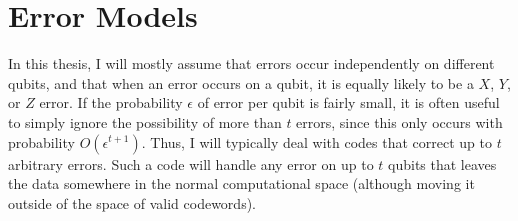 \section{Error Models}

In this thesis, I will mostly assume that errors occur independently on
different qubits, and that when an error occurs on a qubit, it is equally
likely to be a $X$, $Y$, or $Z$ error.  If the probability $\epsilon$ of
error per qubit is fairly small, it is often useful to simply ignore the
possibility of more than $t$ errors, since this only occurs with probability
$O(\epsilon^{t+1})$.  Thus, I will typically deal with codes that correct up
to $t$ arbitrary errors.  Such a code will handle any error on up to $t$ qubits
that leaves the data somewhere in the normal computational space (although
moving it outside of the space of valid codewords).

